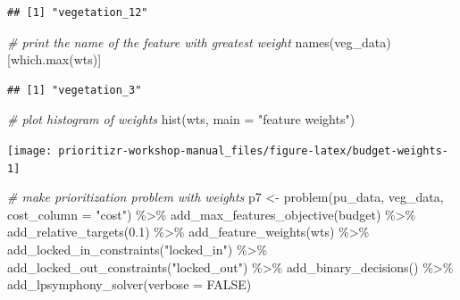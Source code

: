 \documentclass[
  12pt,
]{book}
\newenvironment{Shaded}{\begin{snugshade}}{\end{snugshade}}
\newcommand{\AttributeTok}[1]{\textcolor[rgb]{0.77,0.63,0.00}{#1}}
\newcommand{\CommentTok}[1]{\textcolor[rgb]{0.56,0.35,0.01}{\textit{#1}}}
\newcommand{\ConstantTok}[1]{\textcolor[rgb]{0.00,0.00,0.00}{#1}}
\newcommand{\FloatTok}[1]{\textcolor[rgb]{0.00,0.00,0.81}{#1}}
\newcommand{\FunctionTok}[1]{\textcolor[rgb]{0.00,0.00,0.00}{#1}}
\newcommand{\NormalTok}[1]{#1}
\newcommand{\OtherTok}[1]{\textcolor[rgb]{0.56,0.35,0.01}{#1}}
\newcommand{\SpecialCharTok}[1]{\textcolor[rgb]{0.00,0.00,0.00}{#1}}
\newcommand{\StringTok}[1]{\textcolor[rgb]{0.31,0.60,0.02}{#1}}
\begin{document}
\begin{verbatim}
## [1] "vegetation_12"
\end{verbatim}

\begin{Shaded}
\begin{Highlighting}[]
\CommentTok{\# print the name of the feature with greatest weight}
\FunctionTok{names}\NormalTok{(veg\_data)[}\FunctionTok{which.max}\NormalTok{(wts)]}
\end{Highlighting}
\end{Shaded}

\begin{verbatim}
## [1] "vegetation_3"
\end{verbatim}

\begin{Shaded}
\begin{Highlighting}[]
\CommentTok{\# plot histogram of weights}
\FunctionTok{hist}\NormalTok{(wts, }\AttributeTok{main =} \StringTok{"feature weights"}\NormalTok{)}
\end{Highlighting}
\end{Shaded}

\begin{center}\texttt{[image: prioritizr-workshop-manual\_files/figure-latex/budget-weights-1]} \end{center}

\begin{Shaded}
\begin{Highlighting}[]
\CommentTok{\# make prioritization problem with weights}
\NormalTok{p7 }\OtherTok{\textless{}{-}} \FunctionTok{problem}\NormalTok{(pu\_data, veg\_data, }\AttributeTok{cost\_column =} \StringTok{"cost"}\NormalTok{) }\SpecialCharTok{\%\textgreater{}\%}
      \FunctionTok{add\_max\_features\_objective}\NormalTok{(budget) }\SpecialCharTok{\%\textgreater{}\%}
      \FunctionTok{add\_relative\_targets}\NormalTok{(}\FloatTok{0.1}\NormalTok{) }\SpecialCharTok{\%\textgreater{}\%}
      \FunctionTok{add\_feature\_weights}\NormalTok{(wts) }\SpecialCharTok{\%\textgreater{}\%}
      \FunctionTok{add\_locked\_in\_constraints}\NormalTok{(}\StringTok{"locked\_in"}\NormalTok{) }\SpecialCharTok{\%\textgreater{}\%}
      \FunctionTok{add\_locked\_out\_constraints}\NormalTok{(}\StringTok{"locked\_out"}\NormalTok{) }\SpecialCharTok{\%\textgreater{}\%}
      \FunctionTok{add\_binary\_decisions}\NormalTok{() }\SpecialCharTok{\%\textgreater{}\%}
      \FunctionTok{add\_lpsymphony\_solver}\NormalTok{(}\AttributeTok{verbose =} \ConstantTok{FALSE}\NormalTok{)}
\end{Highlighting}
\end{Shaded}
\end{document}
